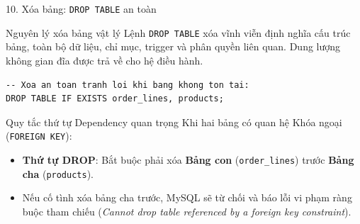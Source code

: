 \documentclass[aspectratio=169,11pt]{beamer}
\newcommand{\kw}[1]{\textcolor{dbblue}{\textbf{#1}}}
\begin{document}
\begin{frame}[fragile]{10. Xóa bảng: \texttt{DROP TABLE} an toàn}
\begin{block}{Nguyên lý xóa bảng vật lý}
  Lệnh \texttt{DROP TABLE} xóa vĩnh viễn định nghĩa cấu trúc bảng, toàn bộ dữ liệu, chỉ mục, trigger và phân quyền liên quan. Dung lượng không gian đĩa được trả về cho hệ điều hành.
\end{block}

\begin{lstlisting}
-- Xoa an toan tranh loi khi bang khong ton tai:
DROP TABLE IF EXISTS order_lines, products;
\end{lstlisting}

\begin{alertblock}{Quy tắc thứ tự Dependency quan trọng}
  Khi hai bảng có quan hệ Khóa ngoại (\texttt{FOREIGN KEY}):
  \begin{itemize}\setlength{\itemsep}{1.5pt}
    \item \kw{Thứ tự DROP}: Bắt buộc phải xóa \textbf{Bảng con} (\texttt{order\_lines}) trước \textbf{Bảng cha} (\texttt{products}).
    \item Nếu cố tình xóa bảng cha trước, MySQL sẽ từ chối và báo lỗi vi phạm ràng buộc tham chiếu (\textit{Cannot drop table referenced by a foreign key constraint}).
  \end{itemize}
\end{alertblock}
\end{frame}
\end{document}
